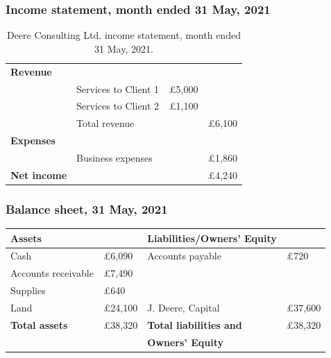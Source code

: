 \subsubsection{Income statement, month ended 31 May, 2021}
\begin{table}[H]
    \centering
    \begin{tabular}{@{}llll@{}}
        \toprule
        \textbf{Revenue} & & & \\
        & Services to Client 1 & \pounds 5,000 & \\
        & Services to Client 2 & \pounds 1,100 & \\
        & Total revenue & & \pounds 6,100 \\
        \midrule
        \textbf{Expenses} & & & \\
        & Business expenses & & \pounds 1,860 \\
        \midrule
        \textbf{Net income} & & & \pounds 4,240 \\
        \bottomrule
    \end{tabular}
    \caption{Deere Consulting Ltd. income statement, month ended 31 May, 2021.}
\end{table}
\subsubsection{Balance sheet, 31 May, 2021}
\begin{table}[H]
    \centering
    \begin{tabular}{@{}llll@{}}
        \toprule
        \textbf{Assets} & & \textbf{Liabilities/Owners' Equity}\\
        \midrule
        Cash & \pounds 6,090 & Accounts payable & \pounds 720\\
        Accounts receivable & \pounds 7,490 & & \\
        Supplies & \pounds 640 & & \\
        Land & \pounds 24,100 & J. Deere, Capital & \pounds 37,600 \\
        \midrule
        \textbf{Total assets} & \pounds 38,320 & \textbf{Total liabilities and} & \pounds 38,320\\
        & & \textbf{Owners' Equity} & \\
        \bottomrule
    \end{tabular}
\end{table}
